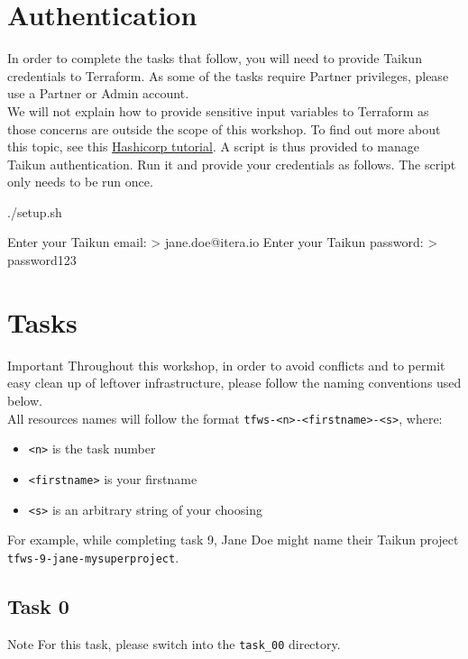 \section{Authentication}
In order to complete the tasks that follow, you will need to provide Taikun credentials to Terraform.
As some of the tasks require Partner privileges, please use a Partner or Admin account.\\

We will not explain how to provide sensitive input variables to Terraform as those concerns are outside the scope of this
workshop. %
To find out more about this topic, see this \href{https://learn.hashicorp.com/tutorials/terraform/sensitive-variables}{Hashicorp tutorial}.
A script is thus provided to manage Taikun authentication.
Run it and provide your credentials as follows. The script only needs to be run once.
\begin{shell}
./setup.sh
\end{shell}
\begin{raw}
Enter your Taikun email:
> jane.doe@itera.io
Enter your Taikun password:
> password123
\end{raw}


\section{Tasks}
\begin{warn}{Important}
  Throughout this workshop, in order to avoid conflicts and
  to permit easy clean up of leftover infrastructure, please follow the naming conventions used below.\\

  All resources names will follow the format \texttt{tfws-<n>-<firstname>-<s>}, where:
  \begin{itemize}
    \item \texttt{<n>} is the task number
    \item \texttt{<firstname>} is your firstname
    \item \texttt{<s>} is an arbitrary string of your choosing
  \end{itemize}
  For example, while completing task 9, Jane Doe might name their Taikun project
  \texttt{tfws-9-jane-mysuperproject}.
\end{warn}

\subsection{Task 0}
\begin{note}{Note}
For this task, please switch into the \texttt{task\_00} directory.
\end{note}
\blindtext{}
